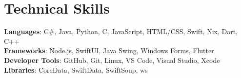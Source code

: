 \documentclass[letterpaper,11pt]{article}
\begin{document}
%
\section{Technical Skills}
 \begin{itemize}[leftmargin=0.15in, label={}]
    \small{\item{
     \textbf{Languages}{: C\#, Java, Python, C, JavaScript, HTML/CSS, Swift, Nix, Dart, C++} \\
     \textbf{Frameworks}{: Node.js, SwiftUI, Java Swing, Windows Forms, Flutter} \\
     \textbf{Developer Tools}{: GitHub, Git, Linux, VS Code, Visual Studio, Xcode} \\
     \textbf{Libraries}{: CoreData, SwiftData, SwiftSoup, ws}
    }}
 \end{itemize}


\end{document}
